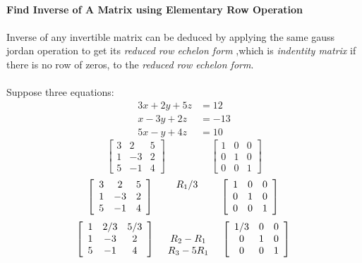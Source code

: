 \documentclass[a4paper, 12pt]{article}
\begin{document}
\\
\textbf{Find Inverse of A Matrix using Elementary Row Operation}
\\
\\
Inverse of any invertible matrix can be deduced by applying the same gauss jordan operation
to get its \textit{reduced row echelon form} ,which is \textit{indentity matrix} 
if there is no row of zeros,
to the \textit{reduced row echelon form}.
\\
\\
Suppose three equations:
\begin{align*}
3x + 2y + 5z &= 12\\
x - 3y + 2z &= -13\\
5x - y + 4z &= 10 
\end{align*}
\[
\left[{
\begin{array}{ccc}
3 & 2 & 5 \\
1 & -3 & 2 \\
5 & -1 & 4
\end{array}
}
\right]
\begin{array}{ccc}
\ \ \ \ \ \ \ \ \ \ \ \ \ \ \ \ \  \\
\ \ \ \ \ \ \ \ \ \ \ \ \ \ \ \ \  \\
\ \ \ \ \ \ \ \ \ \ \ \ \ \ \ \ \  
\end{array}
\left[{
\begin{array}{ccc}
1 & 0 & 0\\
0 & 1 & 0\\
0 & 0 & 1
\end{array} 
}
\right] 
\] 
\[
\left[{
\begin{array}{ccc}
3 & 2 & 5 \\
1 & -3 & 2 \\
5 & -1 & 4
\end{array}
}
\right]
\begin{array}{ccc}
R_1/3 \\
\ \ \ \ \ \ \ \ \ \ \ \ \ \ \ \ \  \\
\ \ \ \ \ \ \ \ \ \ \ \ \ \ \ \ \  
\end{array}
\left[{
\begin{array}{ccc}
1 & 0 & 0\\
0 & 1 & 0\\
0 & 0 & 1
\end{array} 
}
\right]\\ 
\] 
\[
\left[{
\begin{array}{ccc}
1 & 2/3 & 5/3 \\
1 & -3 & 2 \\
5 & -1 & 4
\end{array}
}
\right]
\begin{array}{ccc}
\ \ \ \ \ \ \ \ \ \ \ \ \ \ \ \ \  \\
R_2 - R_1 \\
R_3 - 5R_1
\end{array}
\left[{
\begin{array}{ccc}
1/3 & 0 & 0\\
0 & 1 & 0\\
0 & 0 & 1
\end{array} 
}
\right]\\ 
\] 
\end{document}
